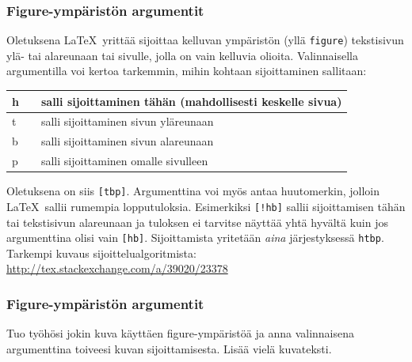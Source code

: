 \begin{frame}[fragile]
    \frametitle{Figure-ympäristön argumentit}
    Oletuksena \LaTeX\ yrittää sijoittaa kelluvan ympäristön (yllä \verb-figure-) tekstisivun ylä- tai alareunaan tai sivulle, jolla on vain kelluvia olioita. Valinnaisella argumentilla voi kertoa tarkemmin, mihin kohtaan sijoittaminen sallitaan:
    \begin{table}
        \begin{tabular}{lcl}

            h && salli sijoittaminen tähän (mahdollisesti keskelle sivua)\\
            \hline
            t && salli sijoittaminen sivun yläreunaan\\
            \hline
            b && salli sijoittaminen sivun alareunaan\\
            \hline
            p && salli sijoittaminen omalle sivulleen

        \end{tabular}
    \end{table}
    Oletuksena on siis \verb-[tbp]-. Argumenttina voi myös antaa huutomerkin, jolloin \LaTeX\ sallii rumempia lopputuloksia. Esimerkiksi \verb-[!hb]- sallii sijoittamisen tähän tai tekstisivun alareunaan ja tuloksen ei tarvitse näyttää yhtä hyvältä kuin jos argumenttina olisi vain \verb-[hb]-. Sijoittamista yritetään \emph{aina} järjestyksessä \verb-htbp-. Tarkempi kuvaus sijoittelualgoritmista: \url{http://tex.stackexchange.com/a/39020/23378}

\end{frame}
\begin{frame}[fragile]
    \frametitle{Figure-ympäristön argumentit}
    \begin{harj}
        Tuo työhösi jokin kuva käyttäen figure-ympäristöä ja anna valinnaisena argumenttina toiveesi kuvan sijoittamisesta. Lisää vielä kuvateksti.
    \end{harj}
\end{frame}
